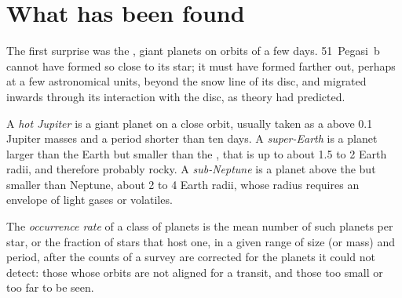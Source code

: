 
\section{What has been found}\label{sec:b3:exoplanets:found}

The first surprise was the , giant planets on orbits of a
few days. 51~Pegasi~b cannot have formed so close to its star; it must
have formed farther out, perhaps at a few astronomical units, beyond the
snow line of its disc, and migrated inwards through its interaction with
the disc, as theory had predicted.

\begin{definition}\label{def:b3:exoplanets:classes}
A \emph{hot Jupiter} is a giant planet on a close orbit,
usually taken as a  above 0.1 Jupiter masses and a period
shorter than ten days. A \emph{super-Earth} is a planet
larger than the Earth but smaller than the , that is up to
about 1.5 to 2 Earth radii, and therefore probably rocky. A \emph{sub-Neptune}
is a planet above the  but smaller than Neptune, about 2 to
4 Earth radii, whose radius requires an envelope of light gases or
volatiles.
\end{definition}

\begin{definition}\label{def:b3:exoplanets:occurrence}
The \emph{occurrence rate} of a class of planets is
the mean number of such planets per star, or the fraction of stars that
host one, in a given range of size (or mass) and period, after the
counts of a survey are corrected for the planets it could not detect:
those whose orbits are not aligned for a transit, and those too small or
too far to be seen.
\end{definition}

